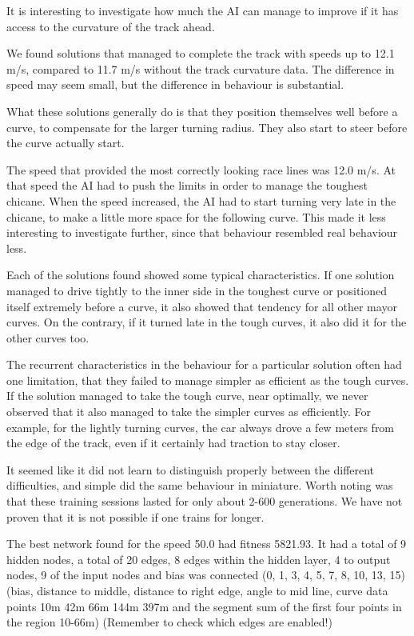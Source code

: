 It is interesting to investigate how much the AI can manage to improve if it has access to the curvature of the track ahead. 

We found solutions that managed to complete the track with speeds up to 12.1 m/s, compared to 11.7 m/s without the track curvature data. The difference in speed may seem small, but the difference in behaviour is substantial.

What these solutions generally do is that they position themselves well before a curve, to compensate for the larger turning radius. They also start to steer before the curve actually start.

The speed that provided the most correctly looking race lines was 12.0 m/s. At that speed the AI had to push the limits in order to manage the toughest chicane. When the speed increased, the AI had to start turning very late in the chicane, to make a little more space for the following curve. This made it less interesting to investigate further, since that behaviour resembled real behaviour less.

Each of the solutions found showed some typical characteristics. If one solution managed to drive tightly to the inner side in the toughest curve or positioned itself extremely before a curve, it also showed that tendency for all other mayor curves. On the contrary, if it turned late in the tough curves, it also did it for the other curves too.

The recurrent characteristics in the behaviour for a particular solution often had one limitation, that they failed to manage simpler as efficient as the tough curves. If the solution managed to take the tough curve, near optimally, we never observed that it also managed to take the simpler curves as efficiently. For example, for the lightly turning curves, the car always drove a few meters from the edge of the track, even if it certainly had traction to stay closer. 

It seemed like it did not learn to distinguish properly between the different difficulties, and simple did the same behaviour in miniature. Worth noting was that these training sessions lasted for only about 2-600 generations. We have not proven that it is not possible if one trains for longer.

The best network found for the speed 50.0 had fitness 5821.93. It had a total of 9 hidden nodes, a total of 20 edges, 8 edges within the hidden layer, 4 to output nodes, 9 of the input nodes and bias was connected (0, 1, 3, 4, 5, 7, 8, 10, 13, 15) (bias, distance to middle, distance to right edge, angle to mid line, curve data points 10m 42m 66m 144m 397m and the segment sum of the first four points in the region 10-66m) (Remember to check which edges are enabled!)


